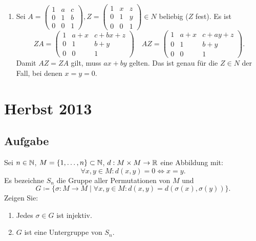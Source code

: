 \begin{enumerate}
	 \item Sei \( A = \begin{pmatrix}
	 	1 & a & c \\
	 	0 & 1 & b \\
	 	0 & 0 & 1
	 \end{pmatrix}, Z = \begin{pmatrix}
	 	1 & x & z \\
	 	0 & 1 & y \\
	 	0 & 0 & 1
	 \end{pmatrix} \in N \) beliebig (\( Z \) fest). Es ist
	 \begin{equation*}
	 	ZA = \begin{pmatrix}
	 		1 & a+x & c+bx+z \\
	 		0 & 1 & b+y \\
	 		0 & 0 & 1
	 	\end{pmatrix} \quad AZ = \begin{pmatrix}
	 		1 & a+x & c+ay+z \\
	 		0 & 1 & b+y \\
	 		0 & 0 & 1
	 	\end{pmatrix}\text{.}
	 \end{equation*}
	 Damit \( AZ=ZA \) gilt, muss \( ax+by \) gelten. Das ist genau für die \( Z \in N \) der Fall, bei denen \( x=y=0 \).
\end{enumerate}

\newpage


\section{Herbst 2013}

\subsection{Aufgabe}

Sei \( n \in \mathbb{N} \), \( M = \{ 1,\dots,n \} \subset \mathbb{N} \), \( d: M \times M \to \mathbb{R} \) eine Abbildung mit:
\begin{equation*}
	\forall x,y \in M: d(x,y) = 0 \Leftrightarrow x = y\text{.}
\end{equation*}
Es bezeichne \( S_n \) die Gruppe aller Permutationen von \( M \) und
\begin{equation*}
	G \coloneqq \{ \sigma: M \to M \mid \forall x,y \in M: d(x,y) = d(\sigma(x), \sigma(y)) \}\text{.}
\end{equation*}
Zeigen Sie:
\begin{enumerate}
	\item Jedes \( \sigma \in G \) ist injektiv.
	\item \( G \) ist eine Untergruppe von \( S_n \). 
\end{enumerate}

